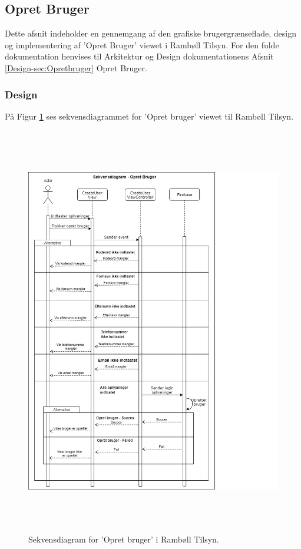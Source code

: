 \subsection{Opret Bruger}\label{sec:Opretbruger}
Dette afsnit indeholder en gennemgang af den grafiske brugergrænseflade, design og implementering af 'Opret Bruger' viewet i Rambøll Tilsyn. For den fulde dokumentation henvises til Arkitektur og Design dokumentationens Afsnit \ref{Design-sec:Opretbruger} Opret Bruger.

\subsubsection{Design}
På Figur \ref{fig:OpretBrugerSekvens} ses sekvensdiagrammet for 'Opret bruger' viewet til Rambøll Tilsyn.
\begin{figure}[H] %
	\centering
	\includegraphics[height=18cm, width=15cm]{Design/Applikation/OpretBruger/OpretBrugerSekvensDiagram}
	\caption{Sekvensdiagram for 'Opret bruger' i Rambøll Tilsyn.}
	\label{fig:OpretBrugerSekvens}
\end{figure}

